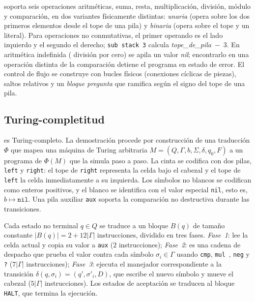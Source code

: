 \sculpt soporta seis operaciones aritm\'eticas, suma, resta,
multiplicaci\'on, divisi\'on, m\'odulo y comparaci\'on, en dos
variantes f\'isicamente distintas: \emph{unaria} (opera sobre los dos
primeros elementos desde el tope de una pila) y \emph{binaria} (opera sobre el tope y un literal).
Para operaciones no conmutativas, el primer operando es el lado
izquierdo y el segundo el derecho; \texttt{sub stack 3} calcula
\emph{tope\_de\_pila}~$-$~3. En aritm\'etica indefinida (\eg
divisi\'on por cero) se apila un valor \textit{nil}; encontrarlo en una
operaci\'on distinta de la comparaci\'on detiene el programa en estado
de error. El control de flujo se construye con bucles f\'isicos
(conexiones c\'iclicas de piezas), saltos relativos y un \emph{bloque
pregunta} que ramifica seg\'un el signo del tope de una pila.

\subsection{Turing-completitud}
\label{sec:methodology:turing}

\sculpt es Turing-completo. La demostraci\'on procede por construcci\'on
de una traducci\'on $\Phi$ que mapea una m\'aquina de Turing arbitraria
$M = (Q, \Gamma, b, \Sigma, \delta, q_0, F)$ a un programa de \sculpt
$\Phi(M)$ que la simula paso a paso. La cinta se codifica con dos
pilas, \texttt{left} y \texttt{right}: el tope de \texttt{right}
representa la celda bajo el cabezal y el tope de \texttt{left} la
celda inmediatamente a su izquierda. Los s\'imbolos no blancos se codifican como
enteros positivos, y el blanco se identifica con el valor especial
\texttt{nil}, esto es, $b \mapsto \texttt{nil}$. Una pila auxiliar \texttt{aux}
soporta la comparaci\'on no destructiva durante las transiciones.

Cada estado no terminal $q \in Q$ se traduce a un bloque $B(q)$ de
tama\~no constante $|B(q)| = 2 + 12|\Gamma|$ instrucciones, dividido
en tres fases. \emph{Fase~1}: lee la celda actual y copia su valor a
\texttt{aux} ($2$ instrucciones); \emph{Fase~2}: es una cadena de
despacho que prueba el valor contra cada s\'imbolo $\sigma_i \in
\Gamma$ usando \texttt{cmp}, \texttt{mul }, \texttt{neg} y \texttt{?}
($7|\Gamma|$ instrucciones); \emph{Fase~3}: ejecuta el manejador
correspondiente a la transici\'on $\delta(q, \sigma_i) = (q', \sigma'_i, D)$,
que escribe el nuevo s\'imbolo y mueve el cabezal ($5|\Gamma|$
instrucciones). Los estados de aceptaci\'on se traducen al bloque
\texttt{HALT}, que termina la ejecuci\'on.

